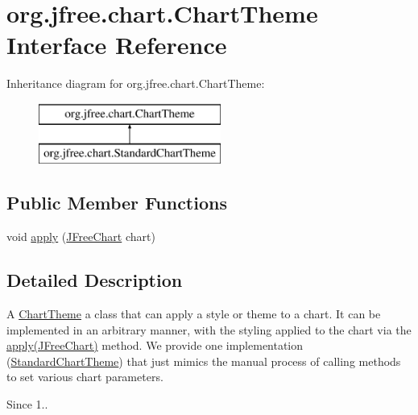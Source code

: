 \hypertarget{interfaceorg_1_1jfree_1_1chart_1_1_chart_theme}{}\section{org.\+jfree.\+chart.\+Chart\+Theme Interface Reference}
\label{interfaceorg_1_1jfree_1_1chart_1_1_chart_theme}
Inheritance diagram for org.\+jfree.\+chart.\+Chart\+Theme\+:\begin{figure}[H]
\begin{center}
\leavevmode
\includegraphics[height=2.000000cm]{interfaceorg_1_1jfree_1_1chart_1_1_chart_theme}
\end{center}
\end{figure}
\subsection*{Public Member Functions}
\begin{DoxyCompactItemize}
\item 
void \mbox{\hyperlink{interfaceorg_1_1jfree_1_1chart_1_1_chart_theme_a7e7055b6ed699dbd041616193a410bd6}{apply}} (\mbox{\hyperlink{classorg_1_1jfree_1_1chart_1_1_j_free_chart}{J\+Free\+Chart}} chart)
\end{DoxyCompactItemize}


\subsection{Detailed Description}
A \mbox{\hyperlink{interfaceorg_1_1jfree_1_1chart_1_1_chart_theme}{Chart\+Theme}} a class that can apply a style or \textquotesingle{}theme\textquotesingle{} to a chart. It can be implemented in an arbitrary manner, with the styling applied to the chart via the {\ttfamily \mbox{\hyperlink{interfaceorg_1_1jfree_1_1chart_1_1_chart_theme_a7e7055b6ed699dbd041616193a410bd6}{apply(\+J\+Free\+Chart)}}} method. We provide one implementation (\mbox{\hyperlink{classorg_1_1jfree_1_1chart_1_1_standard_chart_theme}{Standard\+Chart\+Theme}}) that just mimics the manual process of calling methods to set various chart parameters.

\begin{DoxySince}{Since}
1.. 
\end{DoxySince}


